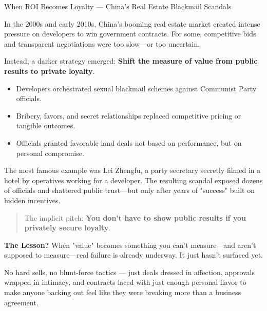 \medskip

\begin{HistoricalSidebar}{When ROI Becomes Loyalty --- China's Real Estate Blackmail Scandals}

    In the 2000s and early 2010s, China's booming real estate market created intense pressure on developers to win government contracts.  
    For some, competitive bids and transparent negotiations were too slow—or too uncertain.
    
    \medskip
    
    Instead, a darker strategy emerged:  
    \textbf{Shift the measure of value from public results to private loyalty}.
    
    \medskip
    
    \begin{itemize}
        \item Developers orchestrated sexual blackmail schemes against Communist Party officials.
        \item Bribery, favors, and secret relationships replaced competitive pricing or tangible outcomes.
        \item Officials granted favorable land deals not based on performance, but on personal compromise.
    \end{itemize}
    
    \medskip
    
    The most famous example was Lei Zhengfu, a party secretary secretly filmed in a hotel by operatives working for a developer.  
    The resulting scandal exposed dozens of officials and shattered public trust—but only after years of "success" built on hidden incentives.
    
    \medskip
    
    \begin{quote}
    The implicit pitch: \textbf{You don't have to show public results if you privately secure loyalty}.
    \end{quote}
    
    \medskip
    
    \textbf{The Lesson?} When "value" becomes something you can't measure—and aren't supposed to measure—real failure is already underway. It just hasn't surfaced yet.
\end{HistoricalSidebar}

\medskip


No hard sells, no blunt-force tactics — just deals dressed in affection, approvals wrapped in intimacy, and contracts laced with just enough personal flavor to make anyone backing out feel like they were breaking more than a business agreement.

